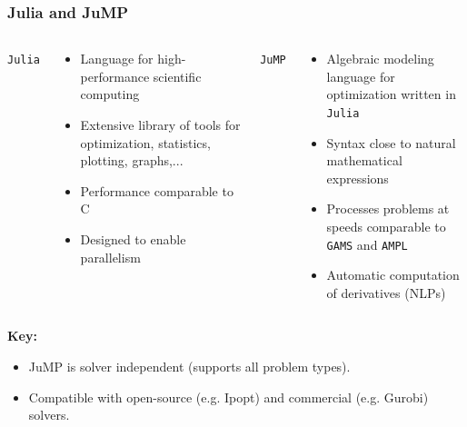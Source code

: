 \begin{frame}[t]
    \frametitle{Julia and JuMP}
    \begin{columns}
        {\tt Julia}
        \begin{small}
        \begin{itemize}
          \item Language for high-performance scientific computing
          \item Extensive library of tools  for optimization, statistics, plotting, graphs,...
          \item Performance comparable to C
          \item Designed to enable parallelism
        \end{itemize}
        \end{small}
        {\tt JuMP}
        \begin{small}
        \begin{itemize}
            \item Algebraic modeling language for optimization written in {\tt Julia}
            \item Syntax close to natural mathematical expressions
            \item Processes problems at speeds comparable to {\tt GAMS} and {\tt AMPL}
            \item Automatic computation of derivatives (NLPs)
        \end{itemize}
        \end{small}
    \end{columns}

    \textbf{Key:}
    \begin{itemize}
        \item JuMP is solver independent (supports all problem types).  \\
        \item Compatible with open-source (e.g. Ipopt) and commercial (e.g. Gurobi) solvers.
    \end{itemize}
\end{frame}

